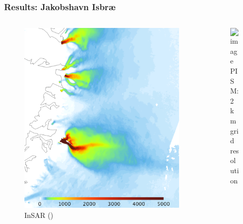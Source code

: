 \documentclass[intlimits]{beamer}
\begin{document}
\begin{frame}
  \frametitle{Results: Jakobshavn Isbr{\ae}}
  \vspace{-2em}
  \begin{columns}[t]
    \begin{column}{.48\linewidth}
      \begin{figure}
        \includegraphics[width=\textwidth]{jak-insar-csurf} \\
        \small{InSAR ()}
      \end{figure}
    \end{column}
    \begin{column}{.48\linewidth}
      \begin{figure}
        \includegraphics<1>[width=\textwidth]{jak2km-ssa-csurf} \\
        \small{PISM: 2\,km grid resolution}
      \end{figure}
    \end{column}
  \end{columns}
\end{frame}
\end{document}

